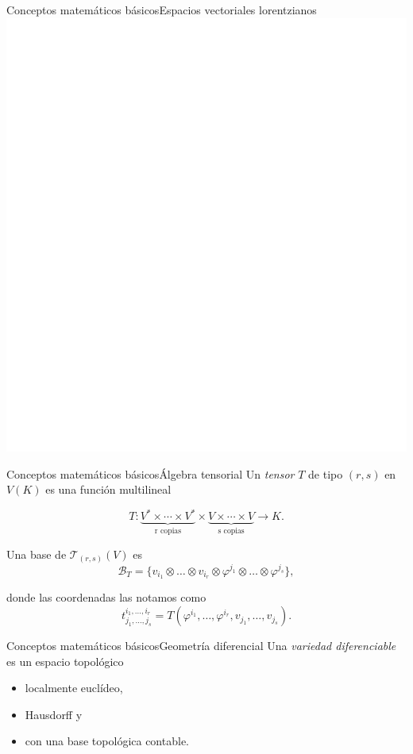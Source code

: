 \begin{frame}{Conceptos matemáticos básicos}{Espacios vectoriales lorentzianos}
	\centering
	\includegraphics[height=0.7\paperheight]{gfx/timecones}
\end{frame}

\begin{frame}{Conceptos matemáticos básicos}{Álgebra tensorial}
	Un \emph{tensor} $T$ de tipo $(r, s)$ en $V(K)$ es una función multilineal

	\[
		T \colon \underbrace{V^* \times \cdots \times V^*}_{\text{r copias}} \times \underbrace{V \times \cdots \times V}_{\text{s copias}} \longrightarrow K.
	\]
	
	\pause
	
	Una base de $\mathcal{T}_{(r,s)}(V)$ es
	\[
		\mathcal{B}_T = \{v_{i_1} \otimes \dots \otimes v_{i_r} \otimes \varphi^{j_1} \otimes \dots \otimes \varphi^{j_s}\},
	\]
	
	\pause
	donde las coordenadas las notamos como \[t^{i_1,\dots,i_r}_{j_1,\dots,j_s} = T(\varphi^{i_1}, \dots, \varphi^{i_r}, v_{j_1}, \dots, v_{j_s}).\]
\end{frame}

\begin{frame}{Conceptos matemáticos básicos}{Geometría diferencial}
	Una \emph{variedad diferenciable} es un espacio topológico
	\begin{itemize}
		\item localmente euclídeo,
		\pause
		\item Hausdorff y
		\pause
		\item con una base topológica contable.	
	\end{itemize}
\end{frame}

